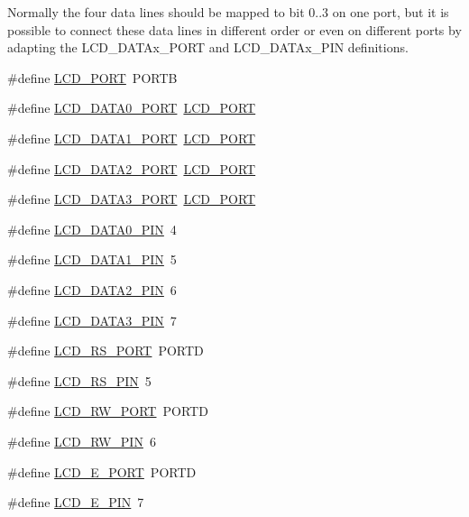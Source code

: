 Normally the four data lines should be mapped to bit 0..3 on one port, but it is possible to connect these data lines in different order or even on different ports by adapting the L\+C\+D\+\_\+\+D\+A\+T\+Ax\+\_\+\+P\+O\+RT and L\+C\+D\+\_\+\+D\+A\+T\+Ax\+\_\+\+P\+IN definitions. \begin{DoxyCompactItemize}
\item 
\#define \hyperlink{group__pfleury__lcd_gabcf42bd88b3c36193f301ca25b033875}{L\+C\+D\+\_\+\+P\+O\+RT}~P\+O\+R\+TB
\item 
\#define \hyperlink{group__pfleury__lcd_gafc0acd4774bcd311595732f5367e266b}{L\+C\+D\+\_\+\+D\+A\+T\+A0\+\_\+\+P\+O\+RT}~\hyperlink{group__pfleury__lcd_gabcf42bd88b3c36193f301ca25b033875}{L\+C\+D\+\_\+\+P\+O\+RT}
\item 
\#define \hyperlink{group__pfleury__lcd_ga345af0248d5739bd8896d4f585618ca2}{L\+C\+D\+\_\+\+D\+A\+T\+A1\+\_\+\+P\+O\+RT}~\hyperlink{group__pfleury__lcd_gabcf42bd88b3c36193f301ca25b033875}{L\+C\+D\+\_\+\+P\+O\+RT}
\item 
\#define \hyperlink{group__pfleury__lcd_ga4d5c48a3f2b9426c14bbca3150834a20}{L\+C\+D\+\_\+\+D\+A\+T\+A2\+\_\+\+P\+O\+RT}~\hyperlink{group__pfleury__lcd_gabcf42bd88b3c36193f301ca25b033875}{L\+C\+D\+\_\+\+P\+O\+RT}
\item 
\#define \hyperlink{group__pfleury__lcd_gaec71b6692f2af7c9de32dbe85fcb51c2}{L\+C\+D\+\_\+\+D\+A\+T\+A3\+\_\+\+P\+O\+RT}~\hyperlink{group__pfleury__lcd_gabcf42bd88b3c36193f301ca25b033875}{L\+C\+D\+\_\+\+P\+O\+RT}
\item 
\#define \hyperlink{group__pfleury__lcd_gafe54d7d886b5c56bed0cf971febbb773}{L\+C\+D\+\_\+\+D\+A\+T\+A0\+\_\+\+P\+IN}~4
\item 
\#define \hyperlink{group__pfleury__lcd_ga97fb520e7b83bb047ac5c9247de57049}{L\+C\+D\+\_\+\+D\+A\+T\+A1\+\_\+\+P\+IN}~5
\item 
\#define \hyperlink{group__pfleury__lcd_ga7f3d53627337f6535cc8daa35876510a}{L\+C\+D\+\_\+\+D\+A\+T\+A2\+\_\+\+P\+IN}~6
\item 
\#define \hyperlink{group__pfleury__lcd_ga54032ce0050853e181f879b69fec4370}{L\+C\+D\+\_\+\+D\+A\+T\+A3\+\_\+\+P\+IN}~7
\item 
\#define \hyperlink{group__pfleury__lcd_gac5be2a22727fd9ca349e1c9bcbfbcd47}{L\+C\+D\+\_\+\+R\+S\+\_\+\+P\+O\+RT}~P\+O\+R\+TD
\item 
\#define \hyperlink{group__pfleury__lcd_gae5c0a0a5750f3aaea06083e3a4a31f5d}{L\+C\+D\+\_\+\+R\+S\+\_\+\+P\+IN}~5
\item 
\#define \hyperlink{group__pfleury__lcd_gae8772bdf31db863b81805c837bdc2da2}{L\+C\+D\+\_\+\+R\+W\+\_\+\+P\+O\+RT}~P\+O\+R\+TD
\item 
\#define \hyperlink{group__pfleury__lcd_ga3ac938dd5fc02a9a232df6605b5f6aa8}{L\+C\+D\+\_\+\+R\+W\+\_\+\+P\+IN}~6
\item 
\#define \hyperlink{group__pfleury__lcd_gaf97f97ff3832d1289bbcb471090ea297}{L\+C\+D\+\_\+\+E\+\_\+\+P\+O\+RT}~P\+O\+R\+TD
\item 
\#define \hyperlink{group__pfleury__lcd_gae644d776392a8d47899d9910c2b8feb6}{L\+C\+D\+\_\+\+E\+\_\+\+P\+IN}~7
\end{DoxyCompactItemize}
